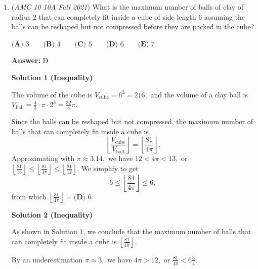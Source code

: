 \begin{enumerate}
\textbf{Solution}

We construct the following table:
 \[\begin{array}{c||c|c||c} & & & \\ [-2.5ex] \textbf{Scenario} & \textbf{Length} & \textbf{Width} & \textbf{Area} \\ [0.5ex] \hline & & & \\ [-2ex] \text{Initial} & 4 & 6 & 24 \\ \text{Menkara shortens one side.} & 3 & 6 & 18 \\ \text{Menkara shortens other side instead.} & 4 & 5 & 20 \end{array}\]Therefore, the answer is $\boxed{\textbf{(E) } 20}.$



	\item (\textit{AMC 10 10A Fall 2021}) What is the maximum number of balls of clay of radius $2$ that can completely fit inside a cube of side length $6$ assuming the balls can be reshaped but not compressed before they are packed in the cube?


 $\textbf{(A) }3\qquad\textbf{(B) }4\qquad\textbf{(C) }5\qquad\textbf{(D) }6\qquad\textbf{(E) }7$

 \textbf{Answer: }D



\textbf{Solution 1 (Inequality)}

The volume of the cube is $V_{\text{cube}}=6^3=216,$ and the volume of a clay ball is $V_{\text{ball}}=\frac43\cdot\pi\cdot2^3=\frac{32}{3}\pi.$

 Since the balls can be reshaped but not compressed, the maximum number of balls that can completely fit inside a cube is 
 \[\left\lfloor\frac{V_{\text{cube}}}{V_{\text{ball}}}\right\rfloor=\left\lfloor\frac{81}{4\pi}\right\rfloor.\]Approximating with $\pi\approx3.14,$ we have $12<4\pi<13,$ or $\left\lfloor\frac{81}{13}\right\rfloor \leq \left\lfloor\frac{81}{4\pi}\right\rfloor \leq \left\lfloor\frac{81}{12}\right\rfloor.$ We simplify to get 
 \[6 \leq \left\lfloor\frac{81}{4\pi}\right\rfloor \leq 6,\]from which $\left\lfloor\frac{81}{4\pi}\right\rfloor=\boxed{\textbf{(D) }6}.$




\textbf{Solution 2 (Inequality)}

As shown in Solution 1, we conclude that the maximum number of balls that can completely fit inside a cube is $\left\lfloor\frac{81}{4\pi}\right\rfloor.$

 By an underestimation $\pi\approx3,$ we have $4\pi>12,$ or $\frac{81}{4\pi}<6\frac34.$


\end{enumerate}
